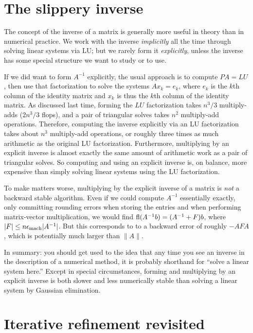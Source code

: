 \documentclass[12pt, leqno]{article} %
\begin{document}

\section{The slippery inverse}

The concept of the inverse of a matrix is generally more useful in
theory than in numerical practice.  We work with the inverse
{\em implicitly} all the time through solving linear systems via LU; but
we rarely form it {\em explicitly}, unless the inverse has some
special structure we want to study or to use.

If we did want to form $A^{-1}$ explicitly, the usual approach is to
compute $PA = LU$, then use that factorization to solve the systems
$Ax_k = e_k$, where $e_k$ is the $k$th column of the identity matrix
and $x_k$ is thus the $k$th column of the identity matrix.  As
discussed last time, forming the $LU$ factorization takes $n^3/3$
multiply-adds ($2n^3/3$ flops), and a pair of triangular solves takes
$n^2$ multiply-add operations.  Therefore, computing the inverse
explicitly via an LU factorization takes about $n^3$ multiply-add
operations, or roughly three times as much arithmetic as the original
LU factorization.  Furthermore, multiplying by an explicit inverse is
almost exactly the same amount of arithmetic work as a pair of
triangular solves.  So computing and using an explicit inverse is, on
balance, more expensive than simply solving linear systems using the
LU factorization.

To make matters worse, multiplying by the explicit inverse of a matrix
is {\em not} a backward stable algorithm.  Even if we could compute
$A^{-1}$ essentially exactly, only committing rounding errors when
storing the entries and when performing matrix-vector multiplication,
we would find $\operatorname{fl}(A^{-1} b) = (A^{-1} + F)b$, where $|F| \leq n
\epsilon_{\mathrm{mach}} |A^{-1}|$.  But this corresponds to to a backward error of
roughly $-AFA$, which is potentially much larger than $\|A\|$.

In summary: you should get used to the idea that any time you see an
inverse in the description of a numerical method, it is probably
shorthand for ``solve a linear system here.''  Except in special
circumstances, forming and multiplying by an explicit inverse is both
slower and less numerically stable than solving a linear system by
Gaussian elimination.

\section{Iterative refinement revisited}
\end{document}
